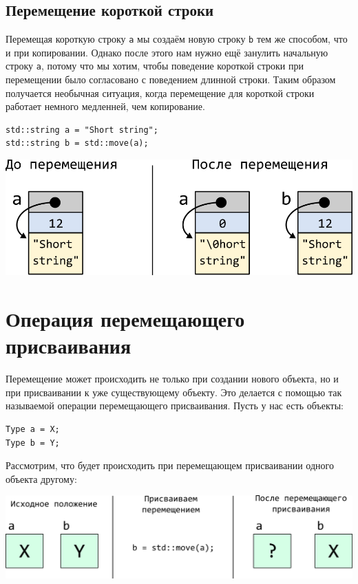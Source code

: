 \documentclass{article}
\begin{document}
\subsection*{Перемещение короткой строки}
Перемещая короткую строку \texttt{a} мы создаём новую строку \texttt{b} тем же способом, что и при копировании. Однако после этого нам нужно ещё занулить начальную строку \texttt{a}, потому что мы хотим, чтобы поведение короткой строки при перемещении было согласовано с поведением длинной строки. Таким образом получается необычная ситуация, когда перемещение для короткой строки работает немного медленней, чем копирование.\\

\begin{minipage}{0.4\textwidth}\noindent
\begin{lstlisting}
std::string a = "Short string";
std::string b = std::move(a);
\end{lstlisting}
\end{minipage}
\begin{minipage}{0.4\textwidth}
\includegraphics[scale=1]{../images/move_short_string.png}
\end{minipage}


\section*{Операция перемещающего присваивания}
Перемещение может происходить не только при создании нового объекта, но и при присваивании к уже существующему объекту. Это делается с помощью так называемой операции перемещающего присваивания. Пусть у нас есть объекты:
\begin{lstlisting}
Type a = X;
Type b = Y;
\end{lstlisting}
Рассмотрим, что будет происходить при перемещающем присваивании одного объекта другому:\\

\begin{center}
\includegraphics[scale=0.9]{../images/move_assignment.png}
\end{center}
\end{document}
